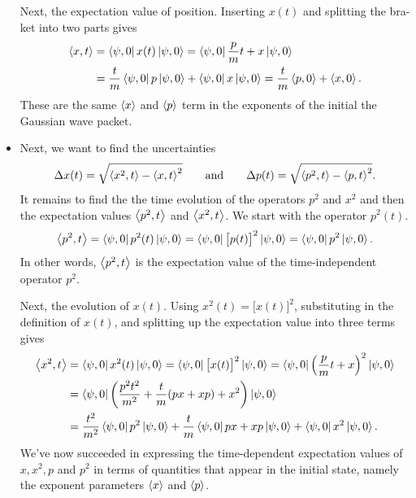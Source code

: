 \documentclass[11pt, a4paper]{article}
\newcommand{\eqtext}[1]{\qquad \text{#1} \qquad}
\begin{document}
\begin{itemize}
	Next, the expectation value of position. Inserting $ x(t) $  and splitting the bra-ket into two parts gives
	\begin{align*}
		\ev{x, t} &= \bra{\psi, 0} x(t) \ket{\psi, 0} = \bra{\psi, 0} \frac{p}{m}t + x \ket{\psi, 0} \\
		&= \frac{t}{m}\bra{\psi, 0} p \ket{\psi, 0} + \bra{\psi, 0} x \ket{\psi, 0} = \frac{t}{m}\ev{p, 0} + \ev{x, 0}.
	\end{align*}
	These are the same  $ \ev{x} $ and $ \ev{p} $ term in the exponents of the initial the Gaussian wave packet. 
	
	\item Next, we want to find the uncertainties
	\begin{equation*}
		\Delta x(t) = \sqrt{\ev{x^{2}, t} - \ev{x, t}^{2}} \eqtext{and} \Delta p(t) = \sqrt{\ev{p^{2}, t} - \ev{p, t}^{2}}.
	\end{equation*}
	It remains to find the the time evolution of the operators $ p^{2} $ and $ x^{2} $ and then the expectation values $ \ev{p^{2}, t} $ and $ \ev{x^{2}, t} $. We start with the operator $ p^{2}(t) $. 
	\begin{equation*}
		\ev{p^{2}, t} = \bra{\psi, 0} p^{2}(t) \ket{\psi, 0} = \bra{\psi, 0} \big[p(t)\big]^{2} \ket{\psi, 0} = \bra{\psi, 0} p^{2} \ket{\psi, 0}.
	\end{equation*}
	In other words, $ \ev{p^{2}, t} $ is the expectation value of the time-independent operator $ p^{2} $. 
	
	Next, the evolution of $ x(t) $. Using $ x^{2}(t) = \big[x(t)\big]^{2} $, substituting in the definition of $ x(t) $, and splitting up the expectation value into three terms gives
	\begin{align*}
		\ev{x^{2}, t} &= \bra{\psi, 0} x^{2}(t) \ket{\psi, 0} =  \bra{\psi, 0} \big[x(t)\big]^{2} \ket{\psi, 0} = \bra{\psi, 0}\left(\frac{p}{m}t + x\right)^{2} \ket{\psi, 0}\\
		&= \bra{\psi, 0}\left(\frac{p^{2}t^{2}}{m^{2}} + \frac{t}{m}(px + xp) + x^{2}\right)\ket{\psi, 0}\\
		&= \frac{t^{2}}{m^{2}}\bra{\psi, 0} p^{2} \ket{\psi, 0} + \frac{t}{m}\bra{\psi, 0} px + xp \ket{\psi, 0} + \bra{\psi, 0} x^{2} \ket{\psi, 0}.
	\end{align*}
	We've now succeeded in expressing the time-dependent expectation values of $ x, x^{2}, p $ and $ p^{2} $ in terms of quantities that appear in the initial state, namely the exponent parameters $ \ev{x} $ and $ \ev{p} $. 
	

\end{itemize}
\end{document}
